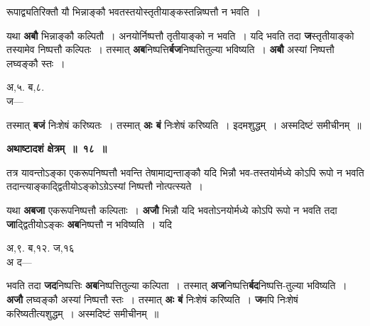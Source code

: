 \documentclass[11pt, openany]{book}
\begin{document}
 {\ab रूपाद्व्यतिरिक्तौ यौ भिन्नाङ्कौ भवतस्तयोस्तृतीयाङ्कस्तन्निष्पत्तौ न भवति~। }

\begin{flushleft}
\begin{minipage}[t]{0.7\textwidth}
\hspace{4mm} यथा \textbf{अबौ} भिन्नाङ्कौ कल्पितौ~। अनयोर्निष्पत्तौ तृतीयाङ्को न  भवति~। यदि भवति तदा \textbf{ज}स्तृतीयाङ्को तस्यामेव निष्पत्तौ कल्पितः~। तस्मात् \textbf{अब}निष्पत्ति\textbf{र्बज}निष्पत्तितुल्या भविष्यति~। \textbf{अबौ} अस्यां निष्पत्तौ लघ्वङ्कौ स्तः~।
\end{minipage} 
\hfill
\begin{minipage}[t]{0.2\textwidth}
अ,५. ब,८.\\
ज---
\end{minipage}
\end{flushleft}

\newpage
\noindent तस्मात् \textbf{बजं} निःशेषं करिष्यतः~। तस्मात् \textbf{अः बं} निःशेषं करिष्यति~। इदमशुद्धम्~। अस्मदिष्टं समीचीनम्~॥
\vspace{2mm}

\begin{center}
\textbf{\large अथाष्टादशं क्षेत्रम्~॥~१८~॥}
\end{center}

 {\ab तत्र यावन्तोऽङ्का एकरूपनिष्पत्तौ भवन्ति तेषामाद्यन्ताङ्कौ  यदि भिन्नौ भव-तस्तयोर्मध्ये कोऽपि रूपो न भवति तदान्त्याङ्काद्द्वितीयोऽङ्कोऽग्रेऽस्यां निष्पत्तौ नोत्पत्स्यते~।}

\begin{flushleft}
\begin{minipage}[t]{0.6\textwidth}
\hspace{4mm} यथा \textbf{अबजा} एकरूपनिष्पत्तौ कल्पिताः~। \textbf{अजौ} भिन्नौ यदि भवतोऽनयोर्मध्ये कोऽपि रूपो न भवति तदा \textbf{जा}द्द्वितीयोऽङ्कः \textbf{अब}निष्पत्तौ न भविष्यति~। यदि
\end{minipage} 
\hfill
\begin{minipage}[t]{0.3\textwidth}
अ,९. ब,१२. ज,१६\\
{\color{white}अ} द---
\end{minipage}
\end{flushleft}
\vspace{-3mm}

\noindent भवति तदा \textbf{जद}निष्पत्तिः \textbf{अब}निष्पत्तितुल्या कल्पिता~। तस्मात् \textbf{अज}निष्पत्ति\textbf{र्बद}निष्पत्ति-तुल्या भविष्यति~। \textbf{अजौ} लघ्वङ्कौ अस्यां निष्पत्तौ स्तः~। तस्मात् \textbf{अः बं} निःशेषं करिष्यति~। \textbf{ज}मपि निःशेषं करिष्यतीत्यशुद्धम्~। अस्मदिष्टं समीचीनम्~॥ 
\vspace{2mm}
\end{document}

